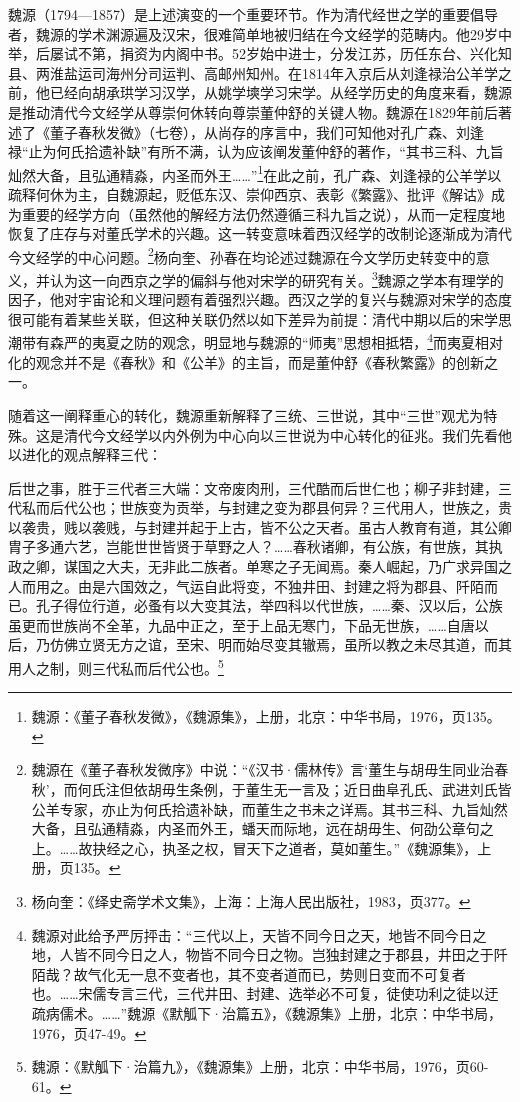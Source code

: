 \documentclass[a4paper, 12pt, openright]{ctexbook}
\renewenvironment{quote}
  {\list{}{\rightmargin2\ccwd \leftmargin2\ccwd \itemindent=2\ccwd \listparindent=2\ccwd}%
   \item\relax\small\kaishu\color{black}}
  {\endlist}
\begin{document}
魏源（1794—1857）是上述演变的一个重要环节。作为清代经世之学的重要倡导者，魏源的学术渊源遍及汉宋，很难简单地被归结在今文经学的范畴内。他29岁中举，后屡试不第，捐资为内阁中书。52岁始中进士，分发江苏，历任东台、兴化知县、两淮盐运司海州分司运判、高邮州知州。在1814年入京后从刘逢禄治公羊学之前，他已经向胡承珙学习汉学，从姚学塽学习宋学。从经学历史的角度来看，魏源是推动清代今文经学从尊崇何休转向尊崇董仲舒的关键人物。魏源在1829年前后著述了《董子春秋发微》（七卷），从尚存的序言中，我们可知他对孔广森、刘逢禄“止为何氏拾遗补缺”有所不满，认为应该阐发董仲舒的著作，“其书三科、九旨灿然大备，且弘通精淼，内圣而外王……”\footnote{魏源：《董子春秋发微》，《魏源集》，上册，北京：中华书局，1976，页135。}在此之前，孔广森、刘逢禄的公羊学以疏释何休为主，自魏源起，贬低东汉、崇仰西京、表彰《繁露》、批评《解诂》成为重要的经学方向（虽然他的解经方法仍然遵循三科九旨之说），从而一定程度地恢复了庄存与对董氏学术的兴趣。这一转变意味着西汉经学的改制论逐渐成为清代今文经学的中心问题。\footnote{魏源在《董子春秋发微序》中说：“《汉书·儒林传》言‘董生与胡毋生同业治春秋’，而何氏注但依胡毋生条例，于董生无一言及；近日曲阜孔氏、武进刘氏皆公羊专家，亦止为何氏拾遗补缺，而董生之书未之详焉。其书三科、九旨灿然大备，且弘通精淼，内圣而外王，蟠天而际地，远在胡毋生、何劭公章句之上。……故抉经之心，执圣之权，冒天下之道者，莫如董生。”《魏源集》，上册，页135。}杨向奎、孙春在均论述过魏源在今文学历史转变中的意义，并认为这一向西京之学的偏斜与他对宋学的研究有关。\footnote{杨向奎：《绎史斋学术文集》，上海：上海人民出版社，1983，页377。}魏源之学本有理学的因子，他对宇宙论和义理问题有着强烈兴趣。西汉之学的复兴与魏源对宋学的态度很可能有着某些关联，但这种关联仍然以如下差异为前提：清代中期以后的宋学思潮带有森严的夷夏之防的观念，明显地与魏源的“师夷”思想相抵牾，\footnote{魏源对此给予严厉抨击：“三代以上，天皆不同今日之天，地皆不同今日之地，人皆不同今日之人，物皆不同今日之物。岂独封建之于郡县，井田之于阡陌哉？故气化无一息不变者也，其不变者道而已，势则日变而不可复者也。……宋儒专言三代，三代井田、封建、选举必不可复，徒使功利之徒以迂疏病儒术。……”魏源《默觚下·治篇五》，《魏源集》上册，北京：中华书局，1976，页47-49。}而夷夏相对化的观念并不是《春秋》和《公羊》的主旨，而是董仲舒《春秋繁露》的创新之一。

随着这一阐释重心的转化，魏源重新解释了三统、三世说，其中“三世”观尤为特殊。这是清代今文经学以内外例为中心向以三世说为中心转化的征兆。我们先看他以进化的观点解释三代：

\begin{quote}
后世之事，胜于三代者三大端：文帝废肉刑，三代酷而后世仁也；柳子非封建，三代私而后代公也；世族变为贡举，与封建之变为郡县何异？三代用人，世族之，贵以袭贵，贱以袭贱，与封建并起于上古，皆不公之天者。虽古人教育有道，其公卿胄子多通六艺，岂能世世皆贤于草野之人？……春秋诸卿，有公族，有世族，其执政之卿，谋国之大夫，无非此二族者。单寒之子无闻焉。秦人崛起，乃广求异国之人而用之。由是六国效之，气运自此将变，不独井田、封建之将为郡县、阡陌而已。孔子得位行道，必蚤有以大变其法，举四科以代世族，……秦、汉以后，公族虽更而世族尚不全革，九品中正之，至于上品无寒门，下品无世族，……自唐以后，乃仿佛立贤无方之谊，至宋、明而始尽变其辙焉，虽所以教之未尽其道，而其用人之制，则三代私而后代公也。\footnote{魏源：《默觚下·治篇九》，《魏源集》上册，北京：中华书局，1976，页60-61。}
\end{quote}
\end{document}
